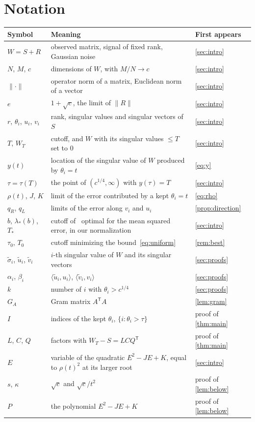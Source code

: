 \documentclass[11pt]{amsart}
\theoremstyle{remark}
\numberwithin{equation}{section}
\begin{document}
\section{Notation}\label{sec:notation}
\begin{center}
\footnotesize
\begin{tabular}{lp{}l}
\toprule
Symbol & Meaning & First appears\\
\midrule
$W=S+R$ & observed matrix, signal of fixed rank, Gaussian noise & \cref{sec:intro}\\
$N$, $M$, $c$ & dimensions of $W$, with $M/N\to c$ & \cref{sec:intro}\\
$\|\cdot\|$ & operator norm of a matrix, Euclidean norm of a vector & \cref{sec:intro}\\
$e$ & $1+\sqrt c$, the limit of $\|R\|$ & \cref{sec:intro}\\
$r$, $\theta_i$, $u_i$, $v_i$ & rank, singular values and singular vectors of $S$ & \cref{sec:intro}\\
$T$, $W_T$ & cutoff, and $W$ with its singular values $\le T$ set to $0$ & \cref{sec:intro}\\
$y(t)$ & location of the singular value of $W$ produced by $\theta_i=t$ & \eqref{eq:y}\\
$\tau=\tau(T)$ & the point of $(c^{1/4},\infty)$ with $y(\tau)=T$ & \cref{sec:intro}\\
$\rho(t)$, $J$, $K$ & limit of the error contributed by a kept $\theta_i=t$ & \eqref{eq:rho}\\
$q_R$, $q_L$ & limits of the error along $v_i$ and $u_i$ & \cref{prop:direction}\\
$b$, $\lambda_*(b)$, $T_*$ & cutoff of~\cite{GDhard} optimal for the mean squared error, in our normalization & \cref{sec:intro}\\
$\tau_0$, $T_0$ & cutoff minimizing the bound~\eqref{eq:uniform} & \cref{rem:best}\\
$\tilde\sigma_i$, $\tilde u_i$, $\tilde v_i$ & $i$-th singular value of $W$ and its singular vectors & \cref{sec:proofs}\\
$\alpha_i$, $\beta_i$ & $\langle\tilde u_i,u_i\rangle$, $\langle\tilde v_i,v_i\rangle$ & \cref{sec:proofs}\\
$k$ & number of $i$ with $\theta_i>c^{1/4}$ & \cref{sec:proofs}\\
$G_A$ & Gram matrix $A^{\mathsf T}A$ & \cref{lem:gram}\\
$I$ & indices of the kept $\theta_i$, $\{i:\theta_i>\tau\}$ & proof of \cref{thm:main}\\
$L$, $C$, $Q$ & factors with $W_T-S=LCQ^{\mathsf T}$ & proof of \cref{thm:main}\\
$E$ & variable of the quadratic $E^2-JE+K$, equal to $\rho(t)^2$ at its larger root & \cref{sec:intro}\\
$s$, $\kappa$ & $\sqrt c$ and $\sqrt c/t^2$ & proof of \cref{lem:below}\\
$P$ & the polynomial $E^2-JE+K$ & proof of \cref{lem:below}\\
\bottomrule
\end{tabular}
\end{center}
\end{document}

